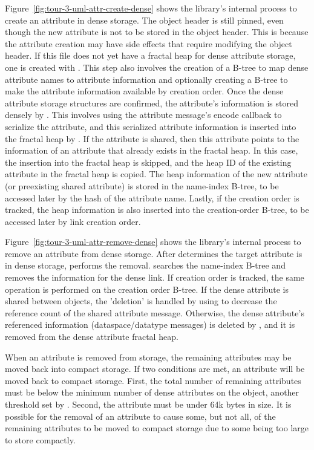 Figure~\ref{fig:tour-3-uml-attr-create-dense} shows the library's internal process to create an attribute in dense storage. The object header is still pinned, even though the new attribute is not to be stored in the object header. This is because the attribute creation may have side effects that require modifying the object header. If this file does not yet have a fractal heap for dense attribute storage, one is created with . This step also involves the creation of a B-tree to map dense attribute names to attribute information and optionally creating a B-tree to make the attribute information available by creation order. Once the dense attribute storage structures are confirmed, the attribute's information is stored densely by . This involves using the attribute message's encode callback to serialize the attribute, and this serialized attribute information is inserted into the fractal heap by . If the attribute is shared, then this attribute points to the information of an attribute that already exists in the fractal heap. In this case, the insertion into the fractal heap is skipped, and the heap ID of the existing attribute in the fractal heap is copied. The heap information of the new attribute (or preexisting shared attribute) is stored in the name-index B-tree, to be accessed later by the hash of the attribute name. Lastly, if the creation order is tracked, the heap information is also inserted into the creation-order B-tree, to be accessed later by link creation order.

Figure~\ref{fig:tour-3-uml-attr-remove-dense} shows the library's internal process to remove an attribute from dense storage. After  determines the target attribute is in dense storage,  performs the removal.  searches the name-index B-tree and removes the information for the dense link. If creation order is tracked, the same operation is performed on the creation order B-tree. If the dense attribute is shared between objects, the 'deletion' is handled by using  to decrease the reference count of the shared attribute message. Otherwise, the dense attribute's referenced information (dataspace/datatype messages) is deleted by , and it is removed from the dense attribute fractal heap.

When an attribute is removed from storage, the remaining attributes may be moved back into compact storage. If two conditions are met, an attribute will be moved back to compact storage. First, the total number of remaining attributes must be below the minimum number of dense attributes on the object, another threshold set by . Second, the attribute must be under 64k bytes in size. It is possible for the removal of an attribute to cause some, but not all, of the remaining attributes to be moved to compact storage due to some being too large to store compactly.

